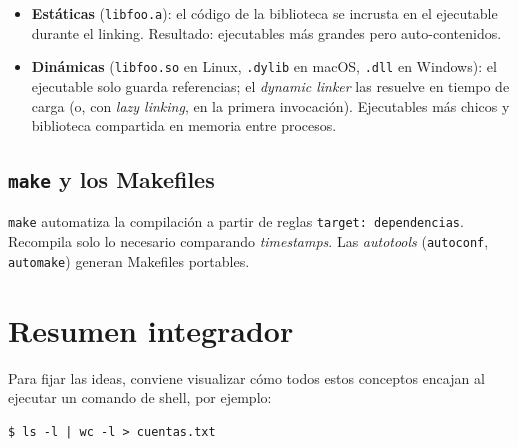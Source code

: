 \documentclass[11pt,a4paper]{article}
\begin{document}
\begin{itemize}[leftmargin=*]
    \item \textbf{Estáticas} (\texttt{libfoo.a}): el código de la
        biblioteca se incrusta en el ejecutable durante el linking.
        Resultado: ejecutables más grandes pero auto-contenidos.
    \item \textbf{Dinámicas} (\texttt{libfoo.so} en Linux,
        \texttt{.dylib} en macOS, \texttt{.dll} en Windows): el
        ejecutable solo guarda referencias; el \emph{dynamic linker}
        las resuelve en tiempo de carga (o, con \emph{lazy linking}, en
        la primera invocación). Ejecutables más chicos y biblioteca
        compartida en memoria entre procesos.
\end{itemize}

\subsection{\texttt{make} y los Makefiles}

\texttt{make} automatiza la compilación a partir de reglas
\texttt{target: dependencias}. Recompila solo lo necesario comparando
\emph{timestamps}. Las \emph{autotools} (\texttt{autoconf},
\texttt{automake}) generan Makefiles portables.

\section{Resumen integrador}

Para fijar las ideas, conviene visualizar cómo todos estos conceptos
encajan al ejecutar un comando de shell, por ejemplo:

\begin{lstlisting}
$ ls -l | wc -l > cuentas.txt
\end{lstlisting}
\end{document}
